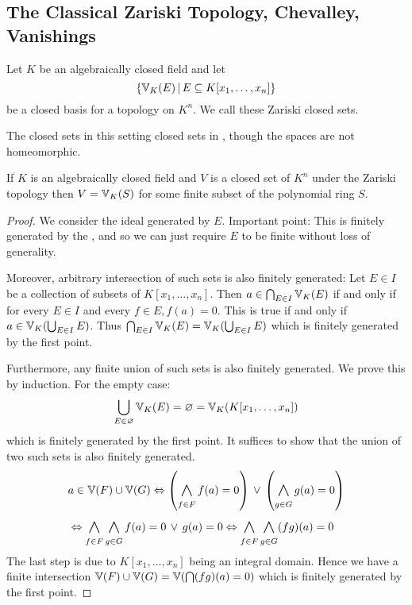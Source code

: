 \subsection{The Classical Zariski Topology, Chevalley, Vanishings}%

\begin{dfn}
    Let $K$ be an algebraically closed field and let 
    \[\left\{\mathbb{V}_K(E) \,|\, E \subseteq K[x_1, \dots, x_n]\right\}\]
    be a closed basis for a topology on $K^n$.
    We call these Zariski closed sets.
\end{dfn}
The closed sets in this setting 
closed sets in ,
though the spaces are not homeomorphic.

\begin{prop}
    If $K$ is an algebraically closed field and 
    $V$ is a closed set of $K^n$ under the
    Zariski topology then $V = \mathbb{V}_K(S)$ for some finite subset 
    of the polynomial ring $S$.
\end{prop}
\begin{proof}
    We consider the ideal generated by $E$.
    Important point: This is finitely generated by the 
    , 
    and so we can just require $E$ 
    to be finite without loss of generality.

    Moreover, 
    arbitrary intersection of such sets is also finitely generated:
    Let $E \in I$ be a collection of subsets of $K[x_1, \dots, x_n]$.
    Then $a \in \bigcap_{E \in I} \mathbb{V}_K(E)$ if and only if 
    for every $E \in I$ and every $f \in E, f(a) = 0$.
    This is true if and only if $a \in \mathbb{V}_K(\bigcup_{E \in I} E)$.
    Thus $\bigcap_{E \in I} \mathbb{V}_K(E) = \mathbb{V}_K(\bigcup_{E \in I} E)$
    which is finitely generated by the first point.

    Furthermore, any finite union of such sets is also finitely generated.
    We prove this by induction.
    For the empty case:
    \[\bigcup_{E \in \varnothing} \mathbb{V}_K(E) = \varnothing = 
    \mathbb{V}_K (K[x_1,\dots,x_n])\]
    which is finitely generated by the first point.
    It suffices to show that the union of two such sets is also finitely
    generated.
    \begin{align*}
        &a \in \V(F) \cup \V(G) 
        \iff \brkt{\bigand{f \in F}{} f(a) = 0} \OR 
        \brkt{\bigand{g \in G}{} g(a) = 0} \\
        & \iff \bigand{f \in F}{} \bigand{g \in G}{} 
        f(a) = 0 \OR g(a) = 0
        \iff \bigand{f \in F}{} \bigand{g \in G}{} 
        (fg)(a) = 0
    \end{align*}
    The last step is due to $K[x_1,\dots,x_n]$ being an integral domain.
    Hence we have a finite intersection
    $\mathbb{V}(F) \cup \mathbb{V}(G) = \mathbb{V}(\bigcap (fg)(a) = 0)$
    which is finitely generated by the first point.
\end{proof}

